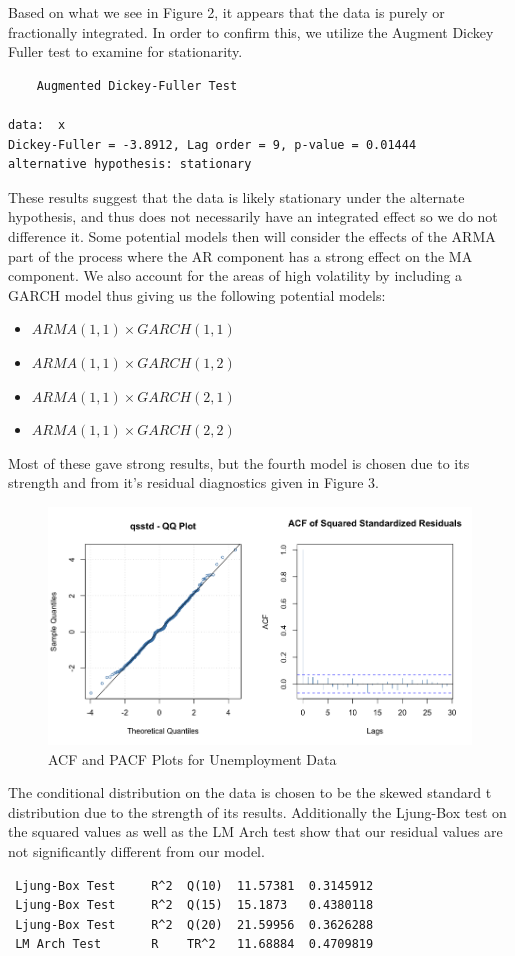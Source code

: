 \documentclass[10pt,a4paper]{article}
\begin{document}
Based on what we see in Figure 2, it appears that the data is purely or fractionally integrated. In order to confirm this, we utilize the Augment Dickey Fuller test to examine for stationarity.

\begin{verbatim}
	Augmented Dickey-Fuller Test

data:  x
Dickey-Fuller = -3.8912, Lag order = 9, p-value = 0.01444
alternative hypothesis: stationary
\end{verbatim}

These results suggest that the data is likely stationary under the alternate hypothesis, and thus does not necessarily have an integrated effect so we do not difference it. Some potential models then will consider the effects of the ARMA part of the process where the AR component has a strong effect on the MA component. We also account for the areas of high volatility by including a GARCH model thus giving us the following potential models:

\begin{itemize}
\item $ARMA(1,1) \times GARCH(1,1)$
\item $ARMA(1,1) \times GARCH(1,2)$
\item $ARMA(1,1) \times GARCH(2,1)$
\item $ARMA(1,1) \times GARCH(2,2)$
\end{itemize}

Most of these gave strong results, but the fourth model is chosen due to its strength and from it's residual diagnostics given in Figure 3.

\begin{figure}[h]
\centering
\includegraphics[width=.8\linewidth]{residualplots} 
\caption{ACF and PACF Plots for Unemployment Data}
\end{figure} 

The conditional distribution on the data is chosen to be the skewed standard t distribution due to the strength of its results. Additionally the Ljung-Box test on the squared values as well as the LM Arch test show that our residual values are not significantly different from our model.
\begin{verbatim}
 Ljung-Box Test     R^2  Q(10)  11.57381  0.3145912   
 Ljung-Box Test     R^2  Q(15)  15.1873   0.4380118   
 Ljung-Box Test     R^2  Q(20)  21.59956  0.3626288   
 LM Arch Test       R    TR^2   11.68884  0.4709819   
\end{verbatim}
\end{document}
